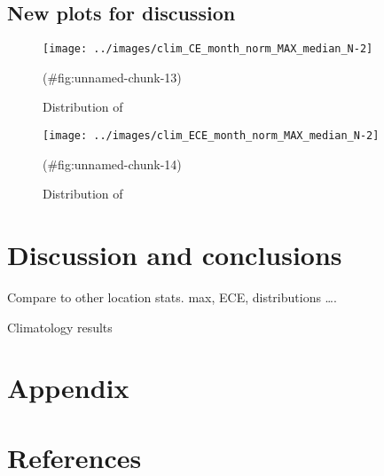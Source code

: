 \documentclass[
]{article}
\begin{document}
\FloatBarrier

\hypertarget{new-plots-for-discussion}{%
\subsection{New plots for discussion}\label{new-plots-for-discussion}}

\begin{figure}[h!]

{\centering \texttt{[image: ../images/clim\_CE\_month\_norm\_MAX\_median\_N-2]} 

}

\caption{Distribution of }(\#fig:unnamed-chunk-13)
\end{figure}

\begin{figure}[h!]

{\centering \texttt{[image: ../images/clim\_ECE\_month\_norm\_MAX\_median\_N-2]} 

}

\caption{Distribution of }(\#fig:unnamed-chunk-14)
\end{figure}

\FloatBarrier

\hypertarget{discussion-and-conclusions}{%
\section{Discussion and conclusions}\label{discussion-and-conclusions}}

Compare to other location stats.
max, ECE, distributions \ldots.

Climatology results

\hypertarget{appendix}{%
\section*{Appendix}\label{appendix}}

\hypertarget{references}{%
\section*{References}\label{references}}
\end{document}
